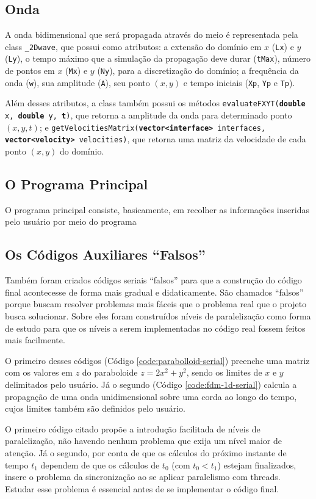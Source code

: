 \subsection{Onda}
A onda bidimensional que será propagada através do meio é representada pela \gls{class} \texttt{\_2Dwave}, que possui como 
atributos: a extensão do domínio em $x$ (\texttt{Lx}) e $y$ (\texttt{Ly}), o tempo máximo que a simulação 
da propagação deve durar (\texttt{tMax}), número de pontos em $x$ (\texttt{Mx}) e $y$ (\texttt{Ny}), para 
a discretização do domínio; a frequência da onda (\texttt{w}), sua amplitude (\texttt{A}), seu ponto $(x, y)$ e tempo iniciais
(\texttt{Xp}, \texttt{Yp} e \texttt{Tp}).

Além desses atributos, a \gls{class} também possui os métodos 
\texttt{evaluateFXYT(\textbf{double} x, \textbf{double} y, \textbf{t})}, que retorna a amplitude da onda para determinado ponto 
$(x, y, t)$; e \texttt{getVelocitiesMatrix(\textbf{vector<interface>} interfaces, \textbf{vector<velocity>} velocities)}, 
que retorna uma matriz da velocidade de cada ponto $(x, y)$ do domínio.

\subsection{O Programa Principal}
O programa principal consiste, basicamente, em recolher as informações inseridas pelo usuário por meio do programa 
 

\subsection{Os Códigos Auxiliares ``Falsos''}
Também foram criados códigos seriais ``falsos'' para que a construção do código final acontecesse de forma mais gradual e didaticamente. 
São chamados ``falsos'' porque buscam resolver problemas mais fáceis que o problema real que o projeto busca solucionar. Sobre 
eles foram construídos níveis de paralelização como forma de estudo para que os níveis a serem implementadas no código real 
fossem feitos mais facilmente.

O primeiro desses códigos (Código \ref{code:parabolloid-serial}) preenche uma matriz com os valores em $z$ do paraboloide $z = 2x^2 + y^2$, 
sendo os limites de $x$ e $y$ delimitados pelo usuário. Já o segundo (Código \ref{code:fdm-1d-serial}) calcula a propagação de uma onda 
unidimensional sobre uma corda ao longo do tempo, cujos limites também são definidos pelo usuário.

O primeiro código citado propõe a introdução facilitada de níveis de paralelização, não havendo nenhum problema que exija 
um nível maior de atenção. Já o segundo, por conta de que os cálculos do próximo instante de tempo $t_1$ dependem de que os cálculos de $t_0$
(com $t_0 < t_1$) estejam finalizados, insere o problema da sincronização ao se aplicar paralelismo com \gls{threads}. Estudar esse problema
é essencial antes de se implementar o código final.

